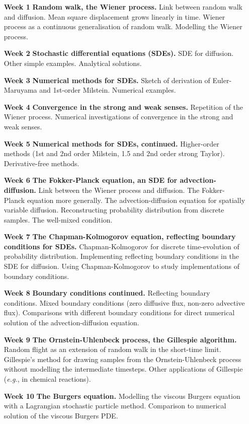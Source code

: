 \documentclass{article}
\begin{document}
\begin{itemize}
    \item[{\bf Week 1}]  {\bf Random walk, the Wiener process.} Link between random walk and diffusion. Mean square displacement grows linearly in time. Wiener process as a continuous generalisation of random walk. Modelling the Wiener process.
    \item[{\bf Week 2}]  {\bf Stochastic differential equations (SDEs).} SDE for diffusion. Other simple examples. Analytical solutions.
    \item[{\bf Week 3}]  {\bf Numerical methods for SDEs.} Sketch of derivation of Euler-Maruyama and 1st-order Milstein. Numerical examples.
    \item[{\bf Week 4}]  {\bf Convergence in the strong and weak senses.} Repetition of the Wiener process. Numerical investigations of convergence in the strong and weak senses.
    \item[{\bf Week 5}]  {\bf Numerical methods for SDEs, continued.} Higher-order methods (1st and 2nd order Milstein, 1.5 and 2nd order strong Taylor). Derivative-free methods.
    \item[{\bf Week 6}]  {\bf The Fokker-Planck equation, an SDE for advection-diffusion.} Link between the Wiener process and diffusion. The Fokker-Planck equation more generally. The advection-diffusion equation for spatially variable diffusion. Reconstructing probability distribution from discrete samples. The well-mixed condition.
    \item[{\bf Week 7}]  {\bf The Chapman-Kolmogorov equation, reflecting boundary conditions for SDEs.} Chapman-Kolmogorov for discrete time-evolution of probability distribution. Implementing reflecting boundary conditions in the SDE for diffusion. Using Chapman-Kolmogorov to study implementations of boundary conditions.
    \item[{\bf Week 8}]  {\bf Boundary conditions continued.} Reflecting boundary conditions. Mixed boundary conditions (zero diffusive flux, non-zero advective flux). Comparisons with different boundary conditions for direct numerical solution of the advection-diffusion equation.
    \item[{\bf Week 9}]  {\bf The Ornstein-Uhlenbeck process, the Gillespie algorithm.} Random flight as an extension of random walk in the short-time limit. Gillespie's method for drawing samples from the Ornstein-Uhlenbeck process without modelling the intermediate timesteps. Other applications of Gillespie (\emph{e.g.}, in chemical reactions).
    \item[{\bf Week 10}] {\bf The Burgers equation.} Modelling the viscous Burgers equation with a Lagrangian stochastic particle method. Comparison to numerical solution of the viscous Burgers PDE.

\end{itemize}
\end{document}
